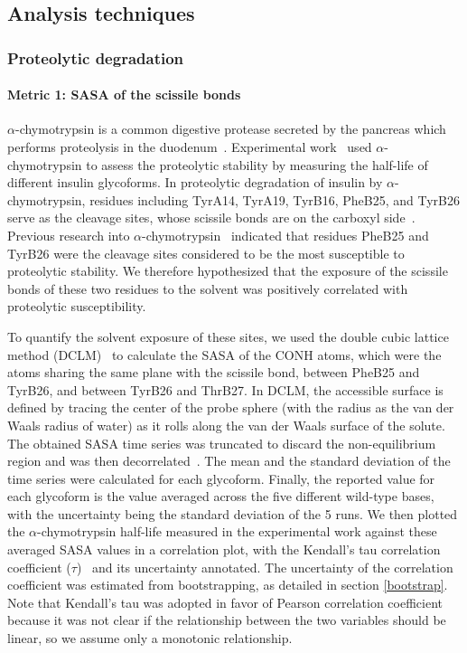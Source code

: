 \documentclass[sn-vancouver]{sn-jnl}
\begin{document}
\subsection{Analysis techniques} \label{analysis_method}
\subsubsection{Proteolytic degradation}
\paragraph{Metric 1: SASA of the scissile bonds}
$\alpha$-chymotrypsin is a common digestive protease secreted by the pancreas which performs proteolysis in the duodenum~\cite{wilcox19705}. Experimental work~\cite{guan2018chemically} used $\alpha$-chymotrypsin to assess the proteolytic stability by measuring the half-life of different insulin glycoforms. In proteolytic degradation of insulin by $\alpha$-chymotrypsin, residues including TyrA14, TyrA19, TyrB16, PheB25, and TyrB26 serve as the cleavage sites, whose scissile bonds are on the carboxyl side~\cite{schilling1991degradation}. Previous research into $\alpha$-chymotrypsin~\cite{schilling1991degradation} indicated that residues PheB25 and TyrB26 were the cleavage sites considered to be the most susceptible to proteolytic stability. We therefore hypothesized that the exposure of the scissile bonds of these two residues to the solvent was positively correlated with proteolytic susceptibility. 

To quantify the solvent exposure of these sites, we used the double cubic lattice method (DCLM)~\cite{eisenhaber1995double} to calculate the SASA of the CONH atoms, which were the atoms sharing the same plane with the scissile bond, between PheB25 and TyrB26, and between TyrB26 and ThrB27. In DCLM, the accessible surface is defined by tracing the center of the probe sphere (with the radius as the van der Waals radius of water) as it rolls along the van der Waals surface of the solute.  The obtained SASA time series was truncated to discard the non-equilibrium region and was then decorrelated~\cite{chodera2016simple}. The mean and the standard deviation of the time series were calculated for each glycoform. Finally, the reported value for each glycoform is the value averaged across the five different wild-type bases, with the uncertainty being the standard deviation of the 5 runs. We then plotted the $\alpha$-chymotrypsin half-life measured in the experimental work against these averaged SASA values in a correlation plot, with the Kendall's tau correlation coefficient ($\tau$)~\cite{kendall1948advanced} and its uncertainty annotated. The uncertainty of the correlation coefficient was estimated from bootstrapping, as detailed in section \ref{bootstrap}. Note that Kendall's tau was adopted in favor of Pearson correlation coefficient because it was not clear if the relationship between the two variables should be linear, so we assume only a monotonic relationship.
\end{document}
